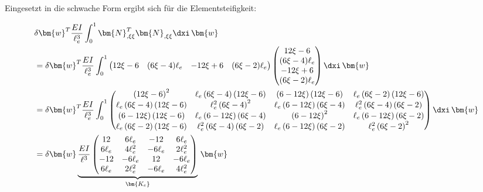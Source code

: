 Eingesetzt in die schwache Form ergibt sich für die Elementsteifigkeit:

\begin{align}
  & \delta \bm{w}^T \frac{EI}{\ell^3_e} \int_0^{1}  \bm{N}_{,\xi\xi}^T \bm{N}_{,\xi\xi} \dxi\, \bm{w} \\
  &= \delta \bm{w}^T \frac{EI}{\ell^3_e} \int_0^{1} \begin{pmatrix}
    12\xi -6 & (6\xi-4)\ell_e  & -12\xi+6 & (6\xi-2)\ell_e 
  \end{pmatrix} \begin{pmatrix}
    12\xi -6 \\
    (6\xi-4)\ell_e  \\
    -12\xi+6 \\
    (6\xi-2)\ell_e 
  \end{pmatrix} \dxi\, \bm{w} \\
  &= \delta \bm{w}^T \frac{EI}{\ell^3_e} \int_0^{1} \begin{pmatrix}\left(12 \xi - 6\right)^{2} & \ell_e \left(6 \xi - 4\right) \left(12 \xi - 6\right) & \left(6 - 12 \xi\right) \left(12 \xi - 6\right) & \ell_e \left(6 \xi - 2\right) \left(12 \xi - 6\right)\\\ell_e \left(6 \xi - 4\right) \left(12 \xi - 6\right) & \ell_e^{2} \left(6 \xi - 4\right)^{2} & \ell_e \left(6 - 12 \xi\right) \left(6 \xi - 4\right) & \ell_e^{2} \left(6 \xi - 4\right) \left(6 \xi - 2\right)\\\left(6 - 12 \xi\right) \left(12 \xi - 6\right) & \ell_e \left(6 - 12 \xi\right) \left(6 \xi - 4\right) & \left(6 - 12 \xi\right)^{2} & \ell_e \left(6 - 12 \xi\right) \left(6 \xi - 2\right)\\\ell_e \left(6 \xi - 2\right) \left(12 \xi - 6\right) & \ell_e^{2} \left(6 \xi - 4\right) \left(6 \xi - 2\right) & \ell_e \left(6 - 12 \xi\right) \left(6 \xi - 2\right) & \ell_e^{2} \left(6 \xi - 2\right)^{2}\end{pmatrix} \dxi\, \bm{w} \\
  &= \delta \bm{w} \underbrace{\frac{EI}{\ell^3} \begin{pmatrix}12 & 6 \ell_e & -12 & 6 \ell_e\\6 \ell_e & 4 \ell_e^{2} & - 6 \ell_e & 2 \ell_e^{2}\\-12 & - 6 \ell_e & 12 & - 6 \ell_e\\6 \ell_e & 2 \ell_e^{2} & - 6 \ell_e & 4 \ell_e^{2}\end{pmatrix}}_{\bm{K_e}} \,  \bm{w}
\end{align}

